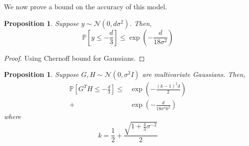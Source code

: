 \documentclass{article}
\theoremstyle{plain}
\newtheorem{proposition}[theorem]{Proposition}
\theoremstyle{definition}
\theoremstyle{remark}
\begin{document}
We now prove a bound on the accuracy of this model.

\begin{proposition}
    Suppose \( y\sim\mathcal{N}(0, d\sigma^2) \). Then,
    \begin{equation}
        \mathbb{P}\left[y\leq -\frac{d}{3}\right] \leq \exp\left(-\frac{d}{18\sigma^2}\right)
    \end{equation}
\end{proposition}
\begin{proof}
    Using Chernoff bound for Gaussians.
\end{proof}

\begin{proposition}
    Suppose \( G,H\sim\mathcal{N}(0,\sigma^2I) \) are multivariate Gaussians. Then,
    \begin{align}
        \mathbb{P}\left[G^T H\leq-\frac{d}{3}\right] \leq &\exp\left(-\frac{(k-1)^2 d}{2}\right)\\ + &\exp\left(-\frac{d}{18\sigma^4 k^2}\right)
    \end{align}
    where 
    \begin{equation}
        k = \frac{1}{2} + \frac{\sqrt{1+\frac{4}{3}\sigma^{-2}}}{2}
    \end{equation}
\end{proposition}
\end{document}
